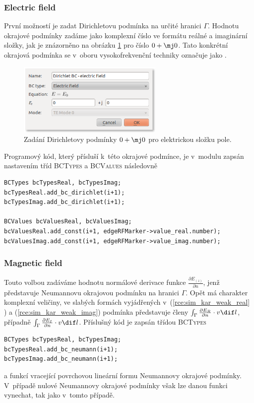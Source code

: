 \subsubsection*{Electric field}
První možností je zadat Dirichletovu podmínka na určité hranici $\Gamma$. Hodnotu okrajové podmínky zadáme jako komplexní číslo ve formátu reálné a imaginární složky, jak je znázorněno na obrázku \ref{obr:sim_BC_electric_field} pro číslo $0 + \mj 0$. Tato konkrétní okrajová podmínka se v~oboru vysokofrekvenční techniky označuje jako .
\begin{figure}[!h]
	\centering
	\includegraphics[width=7cm]{sim_BC_electric_field.png}
	\caption{Zadání Dirichletovy podmínky $0 + \mj 0$ pro elektrickou složku pole.}
	\label{obr:sim_BC_electric_field}
\end{figure}

Programový kód, který přísluší k~této okrajové podmínce, je v~modulu zapsán nastavením tříd \textsc{BCTypes} a \textsc{BCValues} následovně
\begin{verbatim}
BCTypes bcTypesReal, bcTypesImag;
bcTypesReal.add_bc_dirichlet(i+1);
bcTypesImag.add_bc_dirichlet(i+1);
                
BCValues bcValuesReal, bcValuesImag;
bcValuesReal.add_const(i+1, edgeRFMarker->value_real.number);
bcValuesImag.add_const(i+1, edgeRFMarker->value_imag.number);
\end{verbatim}

\subsubsection*{Magnetic field}
Touto volbou zadáváme hodnotu normálové derivace funkce $\frac{\partial E_{(z)}}{\partial n}$, jenž představuje Neumannovu okrajovou podmínku na hranici $\Gamma$. Opět má charakter komplexní veličiny, ve slabých formách vyjádřených v~(\ref{rce:sim_kar_weak_real} ) a (\ref{rce:sim_kar_weak_imag}) podmínka představuje členy $\int_{\Gamma}\frac{\partial E_R}{\partial n}\cdot v\dif l$, případně $\int_{\Gamma}\frac{\partial E_I}{\partial n}\cdot v\dif l$. Příslušný kód je zapsán třídou \textsc{BCTypes}
\begin{verbatim}
BCTypes bcTypesReal, bcTypesImag;
bcTypesReal.add_bc_neumann(i+1);
bcTypesImag.add_bc_neumann(i+1);               
\end{verbatim}
a funkcí vracející povrchovou lineární formu Neumannovy okrajové podmínky. V~případě nulové Neumannovy okrajové podmínky však lze danou funkci vynechat, tak jako v~tomto případě.

